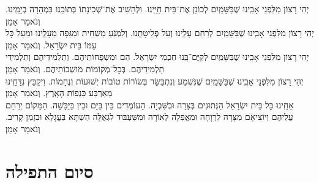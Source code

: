 \documentclass[twoside, openany, parskip=half, 11pt]{book}
\begin{document}
\hagbaha
יְהִי רָצוֹן מִלִּפְנֵי אָבִֽינוּ שֶׁבַּשָּׁמַֽיִם לְכוֹנֵן אֶת־בֵּית חַיֵּֽינוּ. וּלְהָשִׁיב אֶת־שְׁכִינָתוֹ בְּתוֹכֵֽנוּ בִּמְהֵרָה בְיָמֵֽינוּ. וְנֹאמַר אָמֵן׃\\
יְהִי רָצוֹן מִלִּפְנֵי אָבִֽינוּ שֶׁבַּשָּׁמַֽיִם לְרַחֵם עָלֵֽינוּ וְעַל פְּלֵיטָתֵֽנוּ. וְלִמְנֹֽעַ מַשְׁחִית וּמַגֵּפָה מֵעָלֵֽינוּ וּמֵעַל כׇּל עַמּוֹ בֵּית יִשְׂרָאֵל. וְנֹאמַר אָמֵן׃\\
יְהִי רָצוֹן מִלִּפְנֵי אָבִֽינוּ שֶׁבַּשָּׁמַֽיִם לְקַיֶּם־בָּֽנוּ חַכְמֵי יִשְׂרָאֵל. הֵם וּמִשְפְּחוֹתֵיהֶם. וְתַלְמִידֵיהֶם וְתַלְמִידֵי תַלְמִידֵיהֶם. בְּכׇל־מְקוֹמוֹת מֹושְׁבוֹתֵיהֶם. וְנֹאמַר אָמֵן׃\\
יְהִי רָצוֹן מִלִּפְנֵי אָבִֽינוּ שֶׁבַּשָּׁמַֽיִם שֶׁנִּשְׁמַע וְנִתְבַּשֵּׂר בְּשׂוֹרוֹת טוֹבוֹת יְשׁוּעוֹת וְנֶחָמוֹת. וִיקַבֵּץ נִדָּחֵֽינוּ מֵאַרְבַּע כַּנְפוֹת הָאָֽרֶץ. וְנֹאמַר אָמֵן׃\\
אַחֵֽינוּ כׇּל בֵּית יִשְׂרָאֵל הַנְּתוּנִים בְּצָּרָה וּבְשִּׁבְיָה. הָעוֹמְדִים בֵּין בַּיָּם וּבֵין בַּיַּבָּשָׁה. הַמָּקוֹם יְרַחֵם עֲלֵיהֶם וְיוֹצִיאֵם מִצָּרָה לִרְוָחָה וּמֵאֲפֵלָה לְאוֹרָה וּמִשִּׁעְבּוּד לִגְאֻלָּה הַשְׁתָּא בַּעֲגָלָא וּבִזְמַן קָרִיב. וְנֹאמַר אָמֵן׃\\
\yehalelu

\negline
\kafdalet


\etzchaim




\nextpage

\section[סיום התפילה]{ סיום התפילה }
\label{ashrei}
\ashrei

\end{document}
